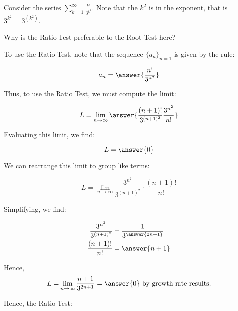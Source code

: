 \documentclass{ximera}
\author{Jim Talamo}
\begin{document}
\begin{exercise}
Consider the series $\sum_{k=1}^{\infty} \frac{k!}{3^{k^2}}$.  Note that the $k^2$ is in the exponent, that is $3^{k^2} = 3^{(k^2)}$.

\begin{multipleChoice}
\end{multipleChoice}

Why is the Ratio Test preferable to the Root Test here?
\begin{multipleChoice}
\end{multipleChoice}

To use the Ratio Test, note that the sequence $\{a_n\}_{n=1}$ is given by the rule:

\[
a_n = \answer{\frac{n!}{3^{n^2}}}
\]

Thus, to use the Ratio Test, we must compute the limit:

\[
L = \lim_{n \to \infty} \answer{\frac{(n+1)!}{3^{(n+1)^2}}  \frac{3^{n^2}}{n!}}
\]

Evaluating this limit, we find:

\[
L = \answer{0}
\]

\begin{hint}
\begin{question}
We can rearrange this limit to group like terms:

\[
L = \lim_{n \to \infty} \frac{3^{n^2}}{3^{(n+1)^2}} \cdot  \frac{(n+1)!}{n!}
\]

Simplifying, we find:

\begin{align*}
 \frac{3^{n^2}}{3^{(n+1)^2}} &=  \frac{1}{3^{\answer{2n+1}}} \\
 \frac{(n+1)!}{n!} &= \answer{n+1}
\end{align*} 

\begin{question}
Hence, 
\[
L = \lim_{n \to \infty} \frac{n+1}{3^{2n+1}} = \answer{0} \textrm{ by growth rate results.}
\]
\end{question}
\end{question}
\end{hint}

Hence, the Ratio Test:
\begin{multipleChoice}
\end{multipleChoice}


\end{exercise}
\end{document}
